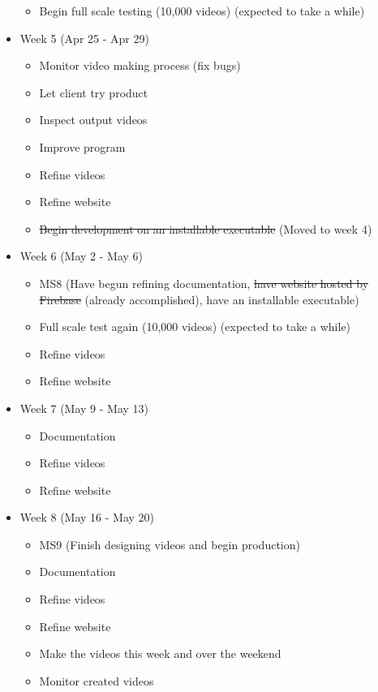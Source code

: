 \documentclass{article}
\begin{document}
\begin{itemize}
\begin{itemize}
        \item Begin full scale testing (10,000 videos) (expected to take a while)
    \end{itemize}
    \item Week 5 (Apr 25 - Apr 29)
    \begin{itemize}
        \item Monitor video making process (fix bugs)
        \item Let client try product
        \item Inspect output videos
        \item Improve program
        \item Refine videos
        \item Refine website
        \item \sout{Begin development on an installable executable} (Moved to week 4)
    \end{itemize}
    \item Week 6 (May 2 - May 6)
    \begin{itemize}
        \item MS8 (Have begun refining documentation, \sout{have website hosted by Firebase} (already accomplished), have an installable executable)
        \item Full scale test again (10,000 videos) (expected to take a while)
        \item Refine videos
        \item Refine website
    \end{itemize}
\item Week 7 (May 9 - May 13)
    \begin{itemize}
        \item Documentation
        \item Refine videos
        \item Refine website
    \end{itemize}
    \item Week 8 (May 16 - May 20)
    \begin{itemize}
        \item MS9 (Finish designing videos and begin production)
        \item Documentation
        \item Refine videos
        \item Refine website
        \item Make the videos this week and over the weekend
        \item Monitor created videos

\end{itemize}
\end{itemize}
\end{document}
